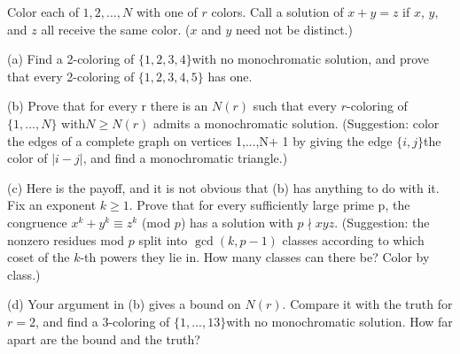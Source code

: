 Color each of $1,2,\dots,N$ with one of $r$ colors. Call a solution of $x+ y= z$ if $x$, $y$, and $z$ all receive the same color. ($x$ and $y$ need not be distinct.)

    
(a) Find a 2-coloring of $\{1,2,3,4\}$with no monochromatic solution, and prove that every 2-coloring of $\{1,2,3,4,5\}$
has one.


(b) Prove that for every r there is an $N(r)$ such that every $r$-coloring of $\{1,...,N\}$ with$ N \geq N(r)$ admits a
monochromatic solution. (Suggestion: color the edges of a complete graph on vertices 1,...,N+ 1 by giving the
edge $\{i,j\}$the color of $|i-j|$, and find a monochromatic triangle.)


(c) Here is the payoff, and it is not obvious that (b) has anything to do with it. Fix an exponent $k\geq 1$. Prove that
for every sufficiently large prime p, the congruence
$x^k + y^k \equiv z^k$ (mod $p$)
has a solution with $p\nmid  xyz$. (Suggestion: the nonzero residues mod $p$ split into $\gcd(k,p-1)$ classes according to
which coset of the $k$-th powers they lie in. How many classes can there be? Color by class.)


(d) Your argument in (b) gives a bound on $N(r)$. Compare it with the truth for $r = 2$, and find a 3-coloring of
$\{1,...,13\}$with no monochromatic solution. How far apart are the bound and the truth?
